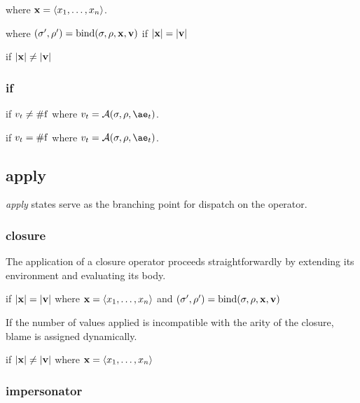 \noindent
{}

\noindent
where $\mathbf{x}=\langle x_1,\dots,x_n\rangle$.


\noindent
where $(\sigma',\rho')=\mathrm{bind}(\sigma,\rho,\mathbf{x},\mathbf{v})$ if $|\mathbf{x}|=|\mathbf{v}|$

 if $|\mathbf{x}|\ne|\mathbf{v}|$

\subsubsection{if}

if $v_t\ne\mathrm{\#f}$
where $v_t=\A{\sigma}{\rho}{\ae_t}$.

if $v_t=\mathrm{\#f}$
where $v_t=\A{\sigma}{\rho}{\ae_t}$.

\subsection{apply}

\emph{apply} states serve as the branching point for dispatch on the operator.

\subsubsection{closure}

The application of a closure operator proceeds straightforwardly by extending its environment and evaluating its body.

if $|\mathbf{x}|=|\mathbf{v}|$ where $\mathbf{x}=\langle x_1,\dots,x_n\rangle$ and $(\sigma',\rho')=\mathrm{bind}(\sigma,\rho,\mathbf{x},\mathbf{v})$

If the number of values applied is incompatible with the arity of the closure, blame is assigned dynamically.

if $|\mathbf{x}|\ne|\mathbf{v}|$ where $\mathbf{x}=\langle x_1,\dots,x_n\rangle$

\subsubsection{impersonator}

